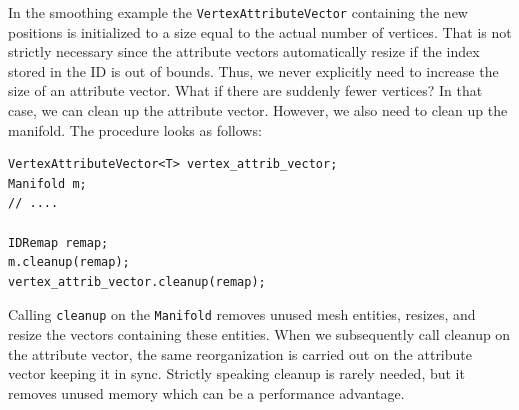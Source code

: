\documentclass[a4paper]{article}
\begin{document}
In the smoothing example the \texttt{VertexAttributeVector} containing the new positions is initialized to a size equal to the actual number of vertices. That is not strictly necessary since the attribute vectors automatically resize if the index stored in the ID is out of bounds. Thus, we never explicitly need to increase the size of an attribute vector. What if there are suddenly fewer vertices? In that case, we can clean up the attribute vector. However, we also need to clean up the manifold. The procedure looks as follows:
\begin{verbatim}
VertexAttributeVector<T> vertex_attrib_vector; 
Manifold m;
// ....

IDRemap remap;
m.cleanup(remap);
vertex_attrib_vector.cleanup(remap);
\end{verbatim}
Calling \texttt{cleanup} on the \texttt{Manifold} removes unused mesh entities, resizes, and resize the vectors containing these entities. When we subsequently call cleanup on the attribute vector, the same reorganization is carried out on the attribute vector keeping it in sync. Strictly speaking cleanup is rarely needed, but it removes unused memory which can be a performance advantage.
\end{document}
